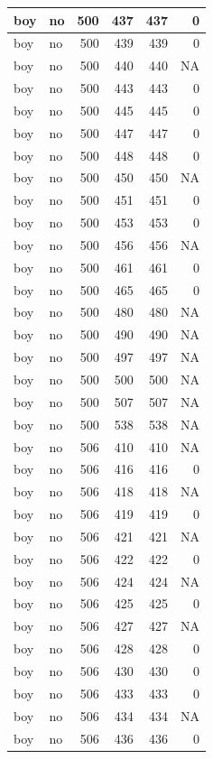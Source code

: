 \documentclass[man]{apa6}
\begin{document}
\begin{tabular}{l|l|r|r|r|r}
\hline
boy & no & 500 & 437 & 437 & 0\\
\hline
boy & no & 500 & 439 & 439 & 0\\
\hline
boy & no & 500 & 440 & 440 & NA\\
\hline
boy & no & 500 & 443 & 443 & 0\\
\hline
boy & no & 500 & 445 & 445 & 0\\
\hline
boy & no & 500 & 447 & 447 & 0\\
\hline
boy & no & 500 & 448 & 448 & 0\\
\hline
boy & no & 500 & 450 & 450 & NA\\
\hline
boy & no & 500 & 451 & 451 & 0\\
\hline
boy & no & 500 & 453 & 453 & 0\\
\hline
boy & no & 500 & 456 & 456 & NA\\
\hline
boy & no & 500 & 461 & 461 & 0\\
\hline
boy & no & 500 & 465 & 465 & 0\\
\hline
boy & no & 500 & 480 & 480 & NA\\
\hline
boy & no & 500 & 490 & 490 & NA\\
\hline
boy & no & 500 & 497 & 497 & NA\\
\hline
boy & no & 500 & 500 & 500 & NA\\
\hline
boy & no & 500 & 507 & 507 & NA\\
\hline
boy & no & 500 & 538 & 538 & NA\\
\hline
boy & no & 506 & 410 & 410 & NA\\
\hline
boy & no & 506 & 416 & 416 & 0\\
\hline
boy & no & 506 & 418 & 418 & NA\\
\hline
boy & no & 506 & 419 & 419 & 0\\
\hline
boy & no & 506 & 421 & 421 & NA\\
\hline
boy & no & 506 & 422 & 422 & 0\\
\hline
boy & no & 506 & 424 & 424 & NA\\
\hline
boy & no & 506 & 425 & 425 & 0\\
\hline
boy & no & 506 & 427 & 427 & NA\\
\hline
boy & no & 506 & 428 & 428 & 0\\
\hline
boy & no & 506 & 430 & 430 & 0\\
\hline
boy & no & 506 & 433 & 433 & 0\\
\hline
boy & no & 506 & 434 & 434 & NA\\
\hline
boy & no & 506 & 436 & 436 & 0\\

\end{tabular}
\end{document}
